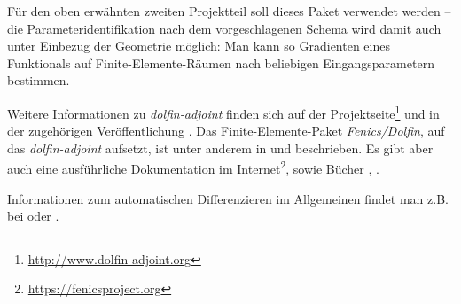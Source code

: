 \documentclass{scrartcl}
\begin{document}
Für den oben erwähnten zweiten Projektteil soll dieses Paket verwendet werden -- die Parameteridentifikation nach dem vorgeschlagenen Schema wird damit auch unter Einbezug der Geometrie möglich: Man kann so Gradienten eines Funktionals auf Finite-Elemente-Räumen nach beliebigen Eingangsparametern bestimmen.\par
Weitere Informationen zu \emph{dolfin-adjoint} finden sich auf der Projektseite\footnote{\url{http://www.dolfin-adjoint.org}} und in der zugehörigen Veröffentlichung \cite{dolfin-adjoint}. Das Finite-Elemente-Paket \emph{Fenics/Dolfin}, auf das \emph{dolfin-adjoint} aufsetzt, ist unter anderem in \cite{fenics} und \cite{dolfin} beschrieben. Es gibt aber auch eine ausführliche Dokumentation im Internet\footnote{\url{https://fenicsproject.org}}, sowie Bücher \cite{fenics-tutorial}, \cite{fenics-book}.\par
Informationen zum automatischen Differenzieren im Allgemeinen findet man z.B. bei \cite{naumann} oder \cite{evaluating}.
\end{document}
